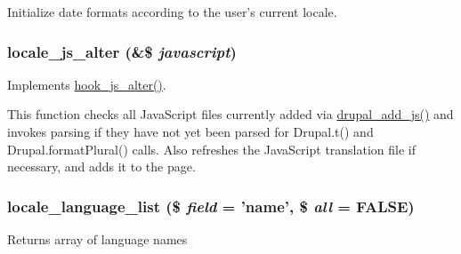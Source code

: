 Initialize date formats according to the user's current locale. \hypertarget{locale_8module_a8bb6cc68121ba7213df8d6a33b372853}{
\subsubsection[{locale\_\-js\_\-alter}]{\setlength{\rightskip}{0pt plus 5cm}locale\_\-js\_\-alter (\&\$ {\em javascript})}}
\label{locale_8module_a8bb6cc68121ba7213df8d6a33b372853}
Implements \hyperlink{group__hooks_ga4e6dc7148292e5d6ce1754927a5ff06d}{hook\_\-js\_\-alter()}.

This function checks all JavaScript files currently added via \hyperlink{common_8inc_a623370a2c3c2de0390dab078d17dca02}{drupal\_\-add\_\-js()} and invokes parsing if they have not yet been parsed for Drupal.t() and Drupal.formatPlural() calls. Also refreshes the JavaScript translation file if necessary, and adds it to the page. \hypertarget{locale_8module_a744c64d4144758494d9e552375258a53}{
\subsubsection[{locale\_\-language\_\-list}]{\setlength{\rightskip}{0pt plus 5cm}locale\_\-language\_\-list (\$ {\em field} = {\ttfamily 'name'}, \/  \$ {\em all} = {\ttfamily FALSE})}}
\label{locale_8module_a744c64d4144758494d9e552375258a53}
Returns array of language names


